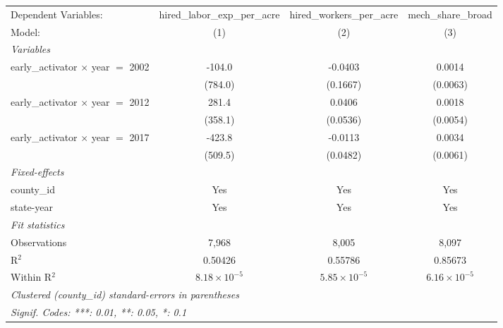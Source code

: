 
\begingroup
\centering
\begin{tabular}{lccc}
   \tabularnewline \midrule \midrule
   Dependent Variables:                      & hired\_labor\_exp\_per\_acre     & hired\_workers\_per\_acre    & mech\_share\_broad\\    
   Model:                                    & (1)                              & (2)                          & (3)\\  
   \midrule
   \emph{Variables}\\
   early\_activator $\times$ year $=$ 2002   & -104.0                           & -0.0403                      & 0.0014\\   
                                             & (784.0)                          & (0.1667)                     & (0.0063)\\   
   early\_activator $\times$ year $=$ 2012   & 281.4                            & 0.0406                       & 0.0018\\   
                                             & (358.1)                          & (0.0536)                     & (0.0054)\\   
   early\_activator $\times$ year $=$ 2017   & -423.8                           & -0.0113                      & 0.0034\\   
                                             & (509.5)                          & (0.0482)                     & (0.0061)\\   
   \midrule
   \emph{Fixed-effects}\\
   county\_id                                & Yes                              & Yes                          & Yes\\  
   state-year                                & Yes                              & Yes                          & Yes\\  
   \midrule
   \emph{Fit statistics}\\
   Observations                              & 7,968                            & 8,005                        & 8,097\\  
   R$^2$                                     & 0.50426                          & 0.55786                      & 0.85673\\  
   Within R$^2$                              & $8.18\times 10^{-5}$             & $5.85\times 10^{-5}$         & $6.16\times 10^{-5}$\\   
   \midrule \midrule
   \multicolumn{4}{l}{\emph{Clustered (county\_id) standard-errors in parentheses}}\\
   \multicolumn{4}{l}{\emph{Signif. Codes: ***: 0.01, **: 0.05, *: 0.1}}\\
\end{tabular}
\par\endgroup


